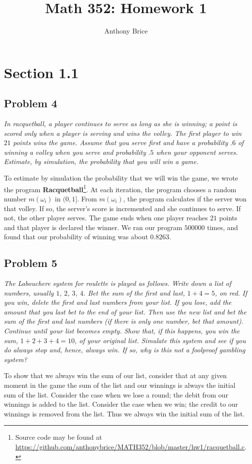 \documentclass{tufte-handout}
\title{Math 352: Homework 1}
\author{Anthony Brice}
\begin{document}
\maketitle
\section{Section 1.1}
\subsection{Problem 4}
\begin{description}
\item \textit{In racquetball, a player continues to serve as long as
    she is winning; a point is scored only when a player is serving
    and wins the volley. The first player to win $21$ points wins the
    game. Assume that you serve first and have a probability $.6$ of
    winning a volley when you serve and probability $.5$ when your
    opponent serves. Estimate, by simulation, the probability that you
    will win a game.}
\end{description}  

To estimate by simulation the probability that we will win the game,
we wrote the program \textbf{Racquetball}\footnote{Source code may be
  found at
  \url{https://github.com/anthonybrice/MATH352/blob/master/hw1/racquetball.c}.}.
At each iteration, the program chooses a random number $m(\omega_i)$
in $(0,1]$. From $m(\omega_i)$, the program calculates if the server
won that volley. If so, the server's score is incremented and she
continues to serve. If not, the other player serves. The game ends
when one player reaches $21$ points and that player is declared the
winner. We ran our program $500000$ times, and found that our
probability of winning was about $0.8263$.

\subsection{Problem 5}
\begin{description}
\item \textit{The \textit{Labouchere system} for roulette is played as
    follows. Write down a list of numbers, usually $1$, $2$, $3$,
    $4$. Bet the sum of the first and last, $1+4 = 5$, on red. If you
    win, delete the first and last numbers from your list. If you
    lose, add the amount that you last bet to the end of your
    list. Then use the new list and bet the sum of the first and last
    numbers (if there is only one number, bet that amount). Continue
    until your list becomes empty. Show that, if this happens, you win
    the sum, $1+2+3+4 = 10$, of your original list. Simulate this
    system and see if you do always stop and, hence, always win. If
    so, why is this not a foolproof gambling system?}
\end{description}

To show that we always win the sum of our list, consider that at any
given moment in the game the sum of the list and our winnings is
always the initial sum of the list. Consider the case when we lose a
round; the debit from our winnings is added to the list. Consider the
case when we win; the credit to our winnings is removed from the
list. Thus we always win the initial sum of the list.
\end{document}
